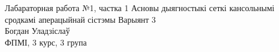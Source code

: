 Лабараторная работа №1, частка 1
\vspace{5mm}
Асновы дыягностыкі сеткі кансольнымі сродкамі аперацыйнай сістэмы
\vspace{5mm}
Варыянт 3\\
Богдан Уладзіслаў\\
ФПМІ, 3 курс, 3 група\\
